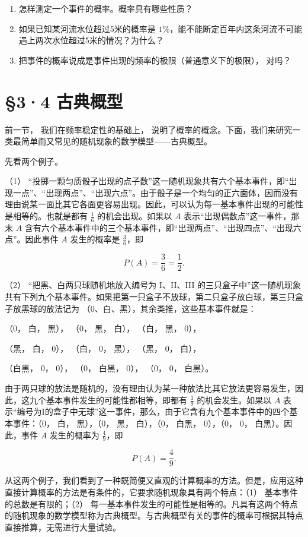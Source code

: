 \begin{enumerate}
\item
  怎样测定一个事件的概率。概率具有哪些性质？
\item
  如果已知某河流水位超过5米的概率是
  \(1\%\)，能不能断定百年内这条河流不可能遇上两次水位超过5米的情况？为什么？
\item
  把事件的概率说成是事件出现的频率的极限（普通意义下的极限）， 对吗？
\end{enumerate}

\section{§3·4 古典概型}

前一节， 我们在频率稳定性的基础上，
说明了概率的概念。下面，我们来研究一类最简单而又常见的随机现象的数学模型------古典概型。

先看两个例子。

（1）
``投掷一颗匀质骰子出现的点子数''这一随机现象共有六个基本事件，即``出现一点''、``出现两点''、``出现六点''。由于骰子是一个均匀的正六面体，因而没有理由说某一面比其它各面更容易出现。因此，可以认为每一基本事件出现的可能性是相等的。也就是都有
\(\frac{1}{6}\) 的机会出现。如果以 \(A\)
表示``出现偶数点''这一事件，那末 \(A\)
含有六个基本事件中的三个基本事件，即``出现两点''、``出现四点''、``出现六点''。因此事件
\(A\) 发生的概率是 \(\frac{3}{6}\)，即

\[
P (A) = \frac {3}{6} = \frac {1}{2}.
\]

（2） ``把黑、白两只球随机地放入编号为 I、II、III
的三只盒子中''这一随机现象共有下列九个基本事件。如果把第一只盒子不放球，第二只盒子放白球，第三只盒子放黑球的放法记为
（0、白、黑），其余类推，这些基本事件就是：

（0， 白， 黑）， （0， 黑， 白）， （白， 黑， 0），

（黑， 白， 0）， （白， 0， 黑）， （黑， 0， 白），

（白黑， 0， 0）， （0， 白黑， 0）， （0， 0， 白黑）。

由于两只球的放法是随机的，没有理由认为某一种放法比其它放法更容易发生，因此，这九个基本事件发生的可能性都相等，即都有
\(\frac{1}{9}\) 的机会发生。如果以 \(A\)
表示``编号为I的盒子中无球''这一事件，那么，由于它含有九个基本事件中的四个基本事件：（0，
白， 黑），（0， 黑， 白），（0， 白黑， 0），（0， 0，
白黑）。因此，事件 \(A\) 发生的概率为 \(\frac{4}{9}\)，即

\[
P (A) = \frac {4}{9}.
\]

从这两个例子，我们看到了一种既简便又直观的计算概率的方法。但是，应用这种直接计算概率的方法是有条件的，它要求随机现象具有两个特点：（1）
基本事件的总数是有限的；（2）
每一基本事件发生的可能性是相等的。凡具有这两个特点的随机现象的数学模型称为古典概型。与古典概型有关的事件的概率可根据其特点直接推算，无需进行大量试验。

